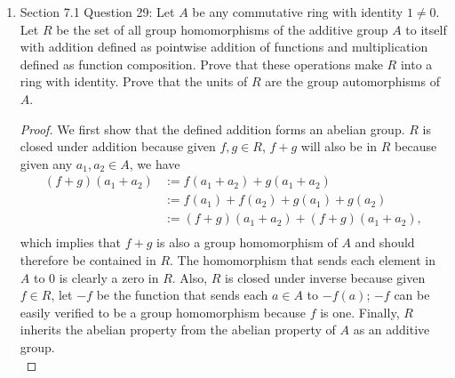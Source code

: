 \documentclass{article}
\begin{document}
\begin{enumerate}[label={\bf Q\arabic*:}]
\begin{proof}
      Multiplication is associative because multiplication by integers is
      associative. The distribution laws also hold from the distributive
      laws of the integers. \\

      It remains to show that $R$ does not have an identity. Assume
      $f=(a_1,\ldots)\in R$ acts as the identity. Let $f_i\in R$ denote the
      function in $R$ that is 1 at the $i$th integer and zero everywhere
      else. Then $ff_i$ will be the function that is $a_i$ at the $i$th
      integer and zero everywhere else. Hence for $ff_i=f_i$, we need
      $a_i=1$. Thus $a_i=1$ for all $i\in\mathbb{Z}^+$, which implies that
      $f$ is not a function in $R$. Hence no such identity exists in $R$.
    \end{proof}

  \item Section 7.1 Question 29: Let $A$ be any commutative ring with
    identity $1\neq0$. Let $R$ be the set of all group homomorphisms of the
    additive group $A$ to itself with addition defined as pointwise
    addition of functions and multiplication defined as function
    composition. Prove that these operations make $R$ into a ring with
    identity. Prove that the units of $R$ are the group automorphisms of
    $A$.

    \begin{proof}
      We first show that the defined addition forms an abelian group. $R$
      is closed under addition because given $f,g\in R$, $f+g$ will also be
      in $R$ because given any $a_1,a_2\in A$, we have 
      \begin{align*}
        (f+g)(a_1+a_2)  &:= f(a_1+a_2)+g(a_1+a_2) \\
                        &:= f(a_1)+f(a_2)+g(a_1)+g(a_2) \\
                        &:= (f+g)(a_1+a_2)+(f+g)(a_1+a_2), \\
      \end{align*}
      which implies that $f+g$ is also a group homomorphism of $A$ and
      should therefore be contained in $R$. The homomorphism that sends
      each element in $A$ to 0 is clearly a zero in $R$. Also, $R$ is
      closed under inverse because given $f\in R$, let $-f$ be the function
      that sends each $a\in A$ to $-f(a)$; $-f$ can be easily verified to
      be a group homomorphism because $f$ is one. Finally, $R$ inherits the
      abelian property from the abelian property of $A$ as an additive
      group. \\


\end{proof}
\end{enumerate}
\end{document}
